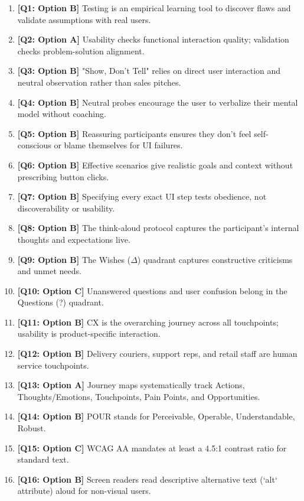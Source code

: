 \begin{expbox}
\begin{enumerate}[leftmargin=6mm, itemsep=2.5mm]
  \item \textbf{[Q1: Option B]} Testing is an empirical learning tool to discover flaws and validate assumptions with real users.
  \item \textbf{[Q2: Option A]} Usability checks functional interaction quality; validation checks problem-solution alignment.
  \item \textbf{[Q3: Option B]} "Show, Don't Tell" relies on direct user interaction and neutral observation rather than sales pitches.
  \item \textbf{[Q4: Option B]} Neutral probes encourage the user to verbalize their mental model without coaching.
  \item \textbf{[Q5: Option B]} Reassuring participants ensures they don't feel self-conscious or blame themselves for UI failures.
  \item \textbf{[Q6: Option B]} Effective scenarios give realistic goals and context without prescribing button clicks.
  \item \textbf{[Q7: Option B]} Specifying every exact UI step tests obedience, not discoverability or usability.
  \item \textbf{[Q8: Option B]} The think-aloud protocol captures the participant's internal thoughts and expectations live.
  \item \textbf{[Q9: Option B]} The Wishes ($\Delta$) quadrant captures constructive criticisms and unmet needs.
  \item \textbf{[Q10: Option C]} Unanswered questions and user confusion belong in the Questions (?) quadrant.
  \item \textbf{[Q11: Option B]} CX is the overarching journey across all touchpoints; usability is product-specific interaction.
  \item \textbf{[Q12: Option B]} Delivery couriers, support reps, and retail staff are human service touchpoints.
  \item \textbf{[Q13: Option A]} Journey maps systematically track Actions, Thoughts/Emotions, Touchpoints, Pain Points, and Opportunities.
  \item \textbf{[Q14: Option B]} POUR stands for Perceivable, Operable, Understandable, Robust.
  \item \textbf{[Q15: Option C]} WCAG AA mandates at least a 4.5:1 contrast ratio for standard text.
  \item \textbf{[Q16: Option B]} Screen readers read descriptive alternative text (`alt` attribute) aloud for non-visual users.

\end{enumerate}
\end{expbox}
